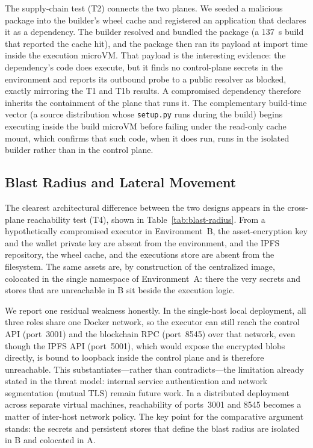 The supply-chain test (T2) connects the two planes. We seeded a malicious package
into the builder's wheel cache and registered an application that declares it as a
dependency. The builder resolved and bundled the package (a 137~s build that
reported the cache hit), and the package then ran its payload at import time
inside the execution microVM. That payload is the interesting evidence: the
dependency's code does execute, but it finds no control-plane secrets in the
environment and reports its outbound probe to a public resolver as blocked,
exactly mirroring the T1 and T1b results. A compromised dependency therefore
inherits the containment of the plane that runs it. The complementary build-time
vector (a source distribution whose \texttt{setup.py} runs during the build)
begins executing inside the build microVM before failing under the read-only
cache mount, which confirms that such code, when it does run, runs in the
isolated builder rather than in the control plane.

\subsection{Blast Radius and Lateral Movement}

The clearest architectural difference between the two designs appears in the
cross-plane reachability test (T4), shown in Table~\ref{tab:blast-radius}. From a
hypothetically compromised executor in Environment~B, the asset-encryption key
and the wallet private key are absent from the environment, and the IPFS
repository, the wheel cache, and the executions store are absent from the
filesystem. The same assets are, by construction of the centralized image,
colocated in the single namespace of Environment~A: there the very secrets and
stores that are unreachable in B sit beside the execution logic.

We report one residual weakness honestly. In the single-host local deployment,
all three roles share one Docker network, so the executor can still reach the
control API (port~3001) and the blockchain RPC (port~8545) over that network,
even though the IPFS API (port~5001), which would expose the encrypted blobs
directly, is bound to loopback inside the control plane and is therefore
unreachable. This substantiates---rather than contradicts---the limitation
already stated in the threat model: internal service authentication and network
segmentation (mutual TLS) remain future work. In a distributed deployment across
separate virtual machines, reachability of ports~3001 and 8545 becomes a matter
of inter-host network policy. The key point for the comparative argument stands:
the secrets and persistent stores that define the blast radius are isolated in B
and colocated in A.

